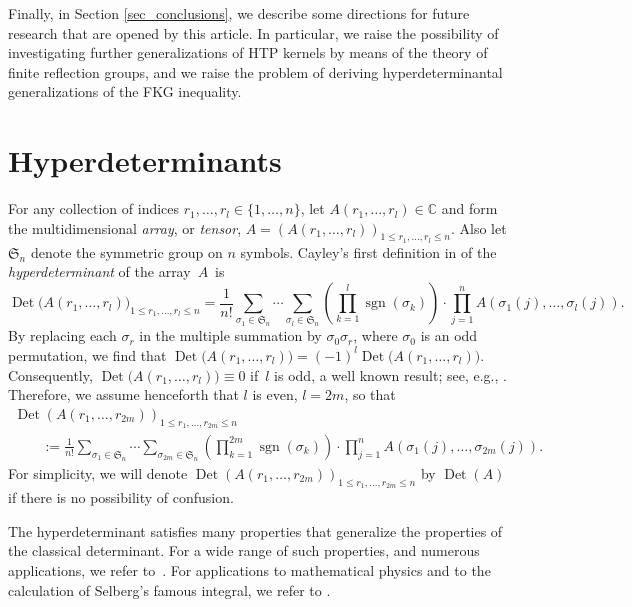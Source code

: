 \documentclass[pdftex]{sigma}
\numberwithin{equation}{section}
\def\C{{\mathbb C}}
\def\sgn{\operatorname{sgn}}
\def\Det{\operatorname{Det}}
\def\frS{\mathfrak{S}}
\begin{document}
Finally, in Section \ref{sec_conclusions}, we describe some directions for future research that are opened by this article. In particular, we raise the possibility of investigating further generalizations of HTP kernels by means of the theory of finite reflection groups, and we raise the problem of deriving hyperdeterminantal generalizations of the FKG inequality.


\section{Hyperdeterminants}
\label{sec_hyperdeterminants}

For any collection of indices $r_1,\dots,r_l \in \{1,\dots,n\}$, let $A(r_1,\dots,r_l) \in \C$ and form the multidimensional \textit{array}, or \textit{tensor},
$A = (A(r_1,\dots,r_l))_{1 \le r_1,\dots,r_l \le n}$. Also let $\frS_n$ denote the symmetric group on $n$ symbols. Cayley's first definition in \cite{cayley46,cayley89, cayley45} of the {\it hyperdeterminant} of the array~$A$~is
\[
\Det\bigl(A(r_1,\dots,r_l)\bigr)_{1 \le r_1,\dots,r_l \le n}
= \frac{1}{n!} \sum_{\sigma_1 \in \frS_n} \cdots \sum_{\sigma_l \in \frS_n} \left(\prod_{k=1}^l \sgn(\sigma_k)\right) \cdot \prod_{j=1}^n A(\sigma_1(j),\dots,\sigma_l(j)).
\]
By replacing each $\sigma_r$ in the multiple summation by $\sigma_0 \sigma_r$, where $\sigma_0$ is an odd permutation, we find that $\Det\bigl(A(r_1,\dots,r_l)\bigr) = (-1)^l \Det\bigl(A(r_1,\dots,r_l)\bigr)$. Consequently, $\Det\bigl(A(r_1,\dots,r_l)\bigr) \equiv 0$ if~$l$ is odd, a well known result; see, e.g., \cite[Section 2]{luquethibon}. Therefore, we assume henceforth that $l$ is even, $l = 2m$, so that
\begin{gather}
\Det(A(r_1,\dots,r_{2m}))_{1 \le r_1,\dots,r_{2m} \le n} \nonumber\\
\qquad:= \frac{1}{n!} \sum_{\sigma_1 \in \frS_n} \cdots \sum_{\sigma_{2m} \in \frS_n} \left(\prod_{k=1}^{2m} \sgn(\sigma_k)\right) \cdot \prod_{j=1}^n A(\sigma_1(j),\dots,\sigma_{2m}(j)).\label{hyperdet}
\end{gather}
For simplicity, we will denote $\Det(A(r_1,\dots,r_{2m}))_{1 \le r_1,\dots,r_{2m} \le n}$ by $\Det(A)$ if there is no possibility of confusion.

The hyperdeterminant satisfies many properties that generalize the properties of the classical determinant. For a wide range of such properties, and numerous applications, we refer to~\cite{cayley46,cayley89,cayley45,evans,GKZ1,GKZ,hval,lecat19,oldenburger,rice,sokolov60, sokolov72}. For applications to mathematical physics and to the calculation of Selberg's famous integral, we refer to \cite{boussicault,luquethibon03,luquethibon}.
\end{document}
